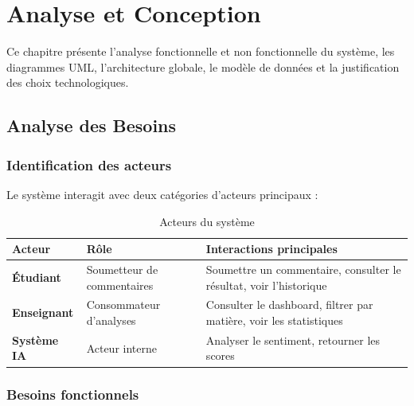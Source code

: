 \chapter{Analyse et Conception}

\begin{infobox}
Ce chapitre présente l'analyse fonctionnelle et non fonctionnelle du système,
les diagrammes UML, l'architecture globale, le modèle de données et la
justification des choix technologiques.
\end{infobox}

\section{Analyse des Besoins}

\subsection{Identification des acteurs}

Le système interagit avec deux catégories d'acteurs principaux :

\begin{table}[H]
\centering
\caption{Acteurs du système}
\label{tab:acteurs}
\renewcommand{\arraystretch}{1.4}
\begin{tabular}{>{\bfseries}p{3cm} p{5cm} p{5cm}}
\toprule
\rowcolor{bleuprincipal!15}
\textbf{Acteur} & \textbf{Rôle} & \textbf{Interactions principales} \\
\midrule
Étudiant & Soumetteur de commentaires & Soumettre un commentaire, consulter le résultat, voir l'historique \\
\midrule
\rowcolor{gray!8}
Enseignant & Consommateur d'analyses & Consulter le dashboard, filtrer par matière, voir les statistiques \\
\midrule
Système IA & Acteur interne & Analyser le sentiment, retourner les scores \\
\bottomrule
\end{tabular}
\end{table}

\subsection{Besoins fonctionnels}

